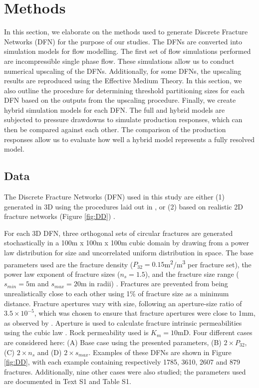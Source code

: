 \documentclass[draft]{agujournal2018}
\begin{document}
\section{Methods}

In this section, we elaborate on the methods used to generate Discrete Fracture Networks (DFN) for the purpose of our studies. The DFNs are converted into simulation models for flow modelling. The first set of flow simulations performed are incompressible single phase flow. These simulations allow us to conduct numerical upscaling of the DFNs. Additionally, for some DFNs, the upscaling results are reproduced using the Effective Medium Theory. In this section, we also outline the procedure for determining threshold partitioning sizes for each DFN based on the outputs from the upscaling procedure. Finally, we create hybrid simulation models for each DFN. The full and hybrid models are subjected to pressure drawdowns to simulate production responses, which can then be compared against each other. The comparison of the production responses allow us to evaluate how well a hybrid model represents a fully resolved model.

\subsection{Data}
The Discrete Fracture Networks (DFN) used in this study are either (1) generated in 3D using the procedures laid out in \citet{Priest1993}, or (2) based on realistic 2D fracture networks (Figure \ref{fig:DD}) \citep{Bisdom2015, Bisdom2017}.

For each 3D DFN, three orthogonal sets of circular fractures are generated stochastically in a 100m x 100m x 100m cubic domain by drawing from a power law distribution for size and uncorrelated uniform distribution in space. The base parameters used are the fracture density ($P_{32}=0.15$m\textsuperscript{2}/m\textsuperscript{3} per fracture set), the power law exponent of fracture sizes ($n_s=1.5$), and the fracture size range ($s_{min}=5$m and $s_{max}=20$m in radii) \citep{Bonnet2001, Dershowitz1992, Ebigbo2016}. Fractures are prevented from being unrealistically close to each other using 1\% of fracture size as a minimum distance. Fracture apertures vary with size, following an aperture-size ratio of $3.5\times 10^{-5}$, which was chosen to ensure that fracture apertures were close to 1mm, as observed by \citet{Bisdom2015}. Aperture is used to calculate fracture intrinsic permeabilities using the cubic law \citep{Witherspoon1980}. Rock permeability used is $K_m=10$mD. Four different cases are considered here: (A) Base case using the presented parameters, (B) $2\times P_{32}$, (C) $2\times n_s$ and (D) $2\times s_{max}$. Examples of these DFNs are shown in Figure \ref{fig:DD}, with each example containing respectively 1785, 3610, 2607 and 879 fractures. Additionally, nine other cases were also studied; the parameters used are documented in Text S1 and Table S1.
\end{document}
